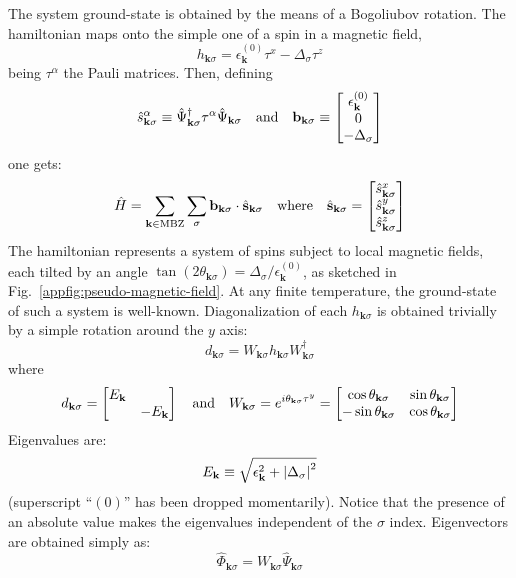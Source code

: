 The system ground-state is obtained by the means of a Bogoliubov rotation. The hamiltonian maps onto the simple one of a spin in a magnetic field,
\[
	h_{\mathbf{k}\sigma} = \epsilon_\mathbf{k}^{(0)} \tau^x - \Delta_\sigma \tau^z
\]
being $\tau^\alpha$ the Pauli matrices. Then, defining
\[
	\hat s_{\mathbf{k}\sigma}^\alpha \equiv \hat \Psi_{\mathbf{k}\sigma}^\dagger \tau^\alpha \hat \Psi_{\mathbf{k}\sigma}
	\qq{and}
	\mathbf{b}_{\mathbf{k}\sigma} \equiv \begin{bmatrix}
		\epsilon_\mathbf{k}^{(0)} \\ 0 \\ -\Delta_\sigma
	\end{bmatrix}
\]
one gets:
\begin{equation}\label{appeq:hubbard-bogoliubov-hamiltonian-pseudofields}
	\hat H = \sum_{\mathbf{k} \in \mathrm{MBZ}} \sum_\sigma \mathbf{b}_{\mathbf{k}\sigma} \cdot \hat{\mathbf{s}}_{\mathbf{k}\sigma}
	\qq{where}
	\hat{\mathbf{s}}_{\mathbf{k}\sigma} = \begin{bmatrix}
		\hat s_{\mathbf{k}\sigma}^x \\
		\hat s_{\mathbf{k}\sigma}^y \\
		\hat s_{\mathbf{k}\sigma}^z
	\end{bmatrix}
\end{equation}
The hamiltonian represents a system of spins subject to local magnetic fields, each tilted by an angle $\tan(2\theta_{\mathbf{k}\sigma}) = \Delta_\sigma/\epsilon_{\mathbf{k}}^{(0)}$, as sketched in Fig.~\ref{appfig:pseudo-magnetic-field}. At any finite temperature, the ground-state of such a system is well-known. Diagonalization of each $h_{\mathbf{k}\sigma}$ is obtained trivially by a simple rotation around the $y$ axis:
\[
	d_{\mathbf{k}\sigma} = W_{\mathbf{k}\sigma} h_{\mathbf{k}\sigma} W_{\mathbf{k}\sigma}^\dagger
\]
where
\[
	d_{\mathbf{k}\sigma} = \begin{bmatrix}
		E_\mathbf{k} & \\
		& - E_\mathbf{k}
	\end{bmatrix}
	\qq{and}
	W_{\mathbf{k}\sigma} = e^{i\theta_{\mathbf{k}\sigma}\tau^y} = \begin{bmatrix}
		\cos\theta_{\mathbf{k}\sigma} & \sin\theta_{\mathbf{k}\sigma} \\
		-\sin\theta_{\mathbf{k}\sigma} & \cos\theta_{\mathbf{k}\sigma}
 	\end{bmatrix}
\]
Eigenvalues are:
\[
	E_\mathbf{k} \equiv \sqrt{\epsilon_{\mathbf{k}}^2 + \abs{\Delta_\sigma}^2}
\]
(superscript ``$(0)$'' has been dropped momentarily). Notice that the presence of an absolute value makes the eigenvalues independent of the $\sigma$ index. Eigenvectors are obtained simply as:
\[
	\hat \Phi_{\mathbf{k}\sigma} = W_{\mathbf{k}\sigma} \hat \Psi_{\mathbf{k}\sigma}
\]
\todo

